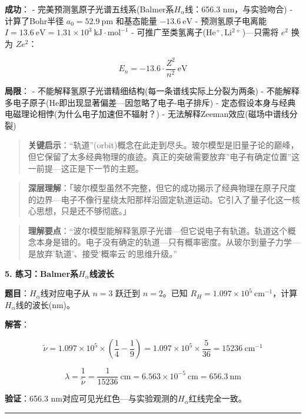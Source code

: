\textbf{成功}：
- 完美预测氢原子光谱五线系(Balmer系\(H_\alpha\)线：656.3 nm，与实验吻合)
- 计算了Bohr半径 \(a_0 = 52.9\ \mathrm{pm}\) 和基态能量 \(-13.6\ \mathrm{eV}\)
- 预测氢原子电离能 \(I = 13.6\ \mathrm{eV} = 1.31 \times 10^3\ \mathrm{kJ\cdot mol^{-1}}\)
- 可推广至类氢离子(\(\mathrm{He^+, Li^{2+}}\))---只需将 \(e^2\) 换为 \(Ze^2\)：

\[E_n = -13.6 \cdot \frac{Z^2}{n^2}\ \mathrm{eV}\]

\textbf{局限}：
- 不能解释氢原子光谱精细结构(每一条谱线实际上分裂为两条)
- 不能解释多电子原子(He即出现显著偏差---因忽略了电子-电子排斥)
- 定态假设本身与经典电磁理论相悖(为什么电子加速但不辐射？)
- 无法解释Zeeman效应(磁场中谱线分裂)

\begin{quote}
\textbf{关键启示}：``轨道''(orbit)概念在此走到尽头。玻尔模型是旧量子论的巅峰，但它保留了太多经典物理的痕迹。真正的突破需要放弃''电子有确定位置''这一前提---这正是下一节的主题。
\end{quote}

\begin{quote}
\textbf{深层理解}：「玻尔模型虽然不完整，但它的成功揭示了经典物理在原子尺度的边界---电子不像行星绕太阳那样沿固定轨道运动。它引入了量子化这一核心思想，只是还不够彻底。」
\end{quote}

\begin{quote}
\textbf{理解要点}：``波尔模型能解释氢原子光谱---但它说电子有轨道。轨道这个概念本身是错的。电子没有确定的轨道---只有概率密度。从玻尔到量子力学---是放弃'轨道'、接受'概率云'的思维升级。''
\end{quote}

\textbf{5. 练习：Balmer系\(H_\alpha\)线波长}

\textbf{题目}：\(H_\alpha\)线对应电子从 \(n=3\) 跃迁到 \(n=2\)。已知 \(R_H = 1.097 \times 10^5\ \mathrm{cm^{-1}}\)，计算\(H_\alpha\)线的波长(nm)。

\textbf{解答}：

\[
\tilde{\nu} = 1.097\times 10^5 \times \left(\frac{1}{4} - \frac{1}{9}\right) = 1.097\times 10^5 \times \frac{5}{36} = 15236\ \mathrm{cm^{-1}}
\]

\[
\lambda = \frac{1}{\tilde{\nu}} = \frac{1}{15236}\ \mathrm{cm} = 6.563\times 10^{-5}\ \mathrm{cm} = 656.3\ \mathrm{nm}
\]

\textbf{验证}：656.3 nm对应可见光红色---与实验观测的\(H_\alpha\)红线完全一致。

\begin{center}\rule{0.5\linewidth}{0.5pt}\end{center}


